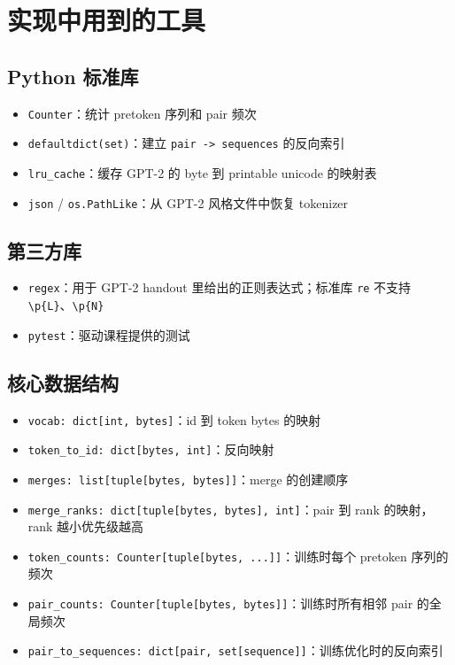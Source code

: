 \documentclass[11pt,a4paper]{ctexart}
\begin{document}
\section{实现中用到的工具}
\subsection{Python 标准库}
\begin{itemize}[leftmargin=2em]
  \item \texttt{Counter}：统计 pretoken 序列和 pair 频次
  \item \texttt{defaultdict(set)}：建立 \texttt{pair -> sequences} 的反向索引
  \item \texttt{lru\_cache}：缓存 GPT-2 的 byte 到 printable unicode 的映射表
  \item \texttt{json} / \texttt{os.PathLike}：从 GPT-2 风格文件中恢复 tokenizer
\end{itemize}

\subsection{第三方库}
\begin{itemize}[leftmargin=2em]
  \item \texttt{regex}：用于 GPT-2 handout 里给出的正则表达式；标准库 \texttt{re} 不支持 \texttt{\textbackslash p\{L\}}、\texttt{\textbackslash p\{N\}}
  \item \texttt{pytest}：驱动课程提供的测试
\end{itemize}

\subsection{核心数据结构}
\begin{itemize}[leftmargin=2em]
  \item \texttt{vocab: dict[int, bytes]}：id 到 token bytes 的映射
  \item \texttt{token\_to\_id: dict[bytes, int]}：反向映射
  \item \texttt{merges: list[tuple[bytes, bytes]]}：merge 的创建顺序
  \item \texttt{merge\_ranks: dict[tuple[bytes, bytes], int]}：pair 到 rank 的映射，rank 越小优先级越高
  \item \texttt{token\_counts: Counter[tuple[bytes, ...]]}：训练时每个 pretoken 序列的频次
  \item \texttt{pair\_counts: Counter[tuple[bytes, bytes]]}：训练时所有相邻 pair 的全局频次
  \item \texttt{pair\_to\_sequences: dict[pair, set[sequence]]}：训练优化时的反向索引
\end{itemize}
\end{document}
